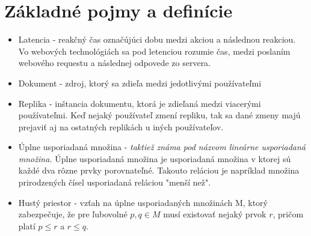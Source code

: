 \chapter{Základné pojmy a definície}

\label{kap:zakladne} %

\begin{itemize}
\item Latencia - reakčný čas označújúci dobu medzi akciou a následnou reakciou. Vo webových 
technológiách sa pod letenciou rozumie čas, medzi poslaním webového requestu a následnej
odpovede zo servera.
\item Dokument - zdroj, ktorý sa zdieľa medzi jedotlivými používateľmi
\item Replika - inštancia dokumentu, ktorá je zdieľaná medzi viacerými používateľmi. Keď nejaký
používateľ zmení repliku, tak sa dané zmeny majú prejaviť aj na ostatných replikách u iných
používateľov.
\item Úplne usporiadaná množina - \textit{taktiež známa pod názvom lineárne usporiadaná množina.} 
Úplne usporiadaná množina je usporiadaná množina v ktorej sú každé dva rôzne prvky porovnateľné. 
Takouto reláciou je napríklad množina prirodzených čísel usporiadaná reláciou "menší než".
\item Hustý priestor - vzťah na úplne usporiadaných množinách M, ktorý zabezpečuje, že pre 
ľubovolné $p, q \in M$ musí existovať nejaký prvok $r$, pričom platí $p \leq r$ a 
$r \leq q$.
\end{itemize}
